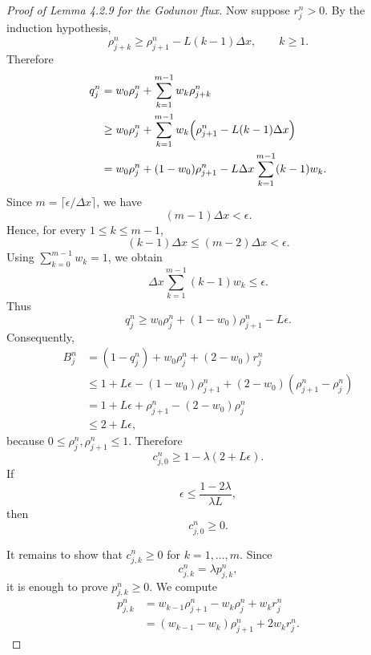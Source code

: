 \begin{proof}[Proof of Lemma 4.2.9 for the Godunov flux]
    Now suppose \(r_j^n>0\). By the induction hypothesis,
    \[
        \rho_{j+k}^n
        \ge
        \rho_{j+1}^n - L(k-1)\Delta x,
        \qquad k\ge1.
    \]
    Therefore
    \[
        \begin{aligned}
            q_j^n
             & =
            w_0\rho_j^n+\sum_{k=1}^{m-1}w_k\rho_{j+k}^n \\
             & \ge
            w_0\rho_j^n
            +
            \sum_{k=1}^{m-1}w_k
            \Bigl(\rho_{j+1}^n-L(k-1)\Delta x\Bigr)     \\
             & =
            w_0\rho_j^n
            +(1-w_0)\rho_{j+1}^n
            -
            L\Delta x\sum_{k=1}^{m-1}(k-1)w_k.
        \end{aligned}
    \]
    Since \(m=\lceil \epsilon/\Delta x\rceil\), we have
    \[
        (m-1)\Delta x<\epsilon.
    \]
    Hence, for every \(1\le k\le m-1\),
    \[
        (k-1)\Delta x\le (m-2)\Delta x <\epsilon.
    \]
    Using \(\sum_{k=0}^{m-1}w_k=1\), we obtain
    \[
        \Delta x\sum_{k=1}^{m-1}(k-1)w_k
        \le \epsilon.
    \]
    Thus
    \[
        q_j^n
        \ge
        w_0\rho_j^n
        +(1-w_0)\rho_{j+1}^n
        -L\epsilon.
    \]
    Consequently,
    \[
        \begin{aligned}
            B_j^n
             & =
            (1-q_j^n)+w_0\rho_j^n+(2-w_0)r_j^n \\
             & \le
            1+L\epsilon
            -(1-w_0)\rho_{j+1}^n
            +(2-w_0)(\rho_{j+1}^n-\rho_j^n)    \\
             & =
            1+L\epsilon
            +\rho_{j+1}^n
            -(2-w_0)\rho_j^n                   \\
             & \le
            2+L\epsilon,
        \end{aligned}
    \]
    because \(0\le \rho_j^n,\rho_{j+1}^n\le1\). Therefore
    \[
        c_{j,0}^n
        \ge
        1-\lambda(2+L\epsilon).
    \]
    If
    \[
        \epsilon\le \frac{1-2\lambda}{\lambda L},
    \]
    then
    \[
        c_{j,0}^n\ge0.
    \]

    It remains to show that \(c_{j,k}^n\ge0\) for \(k=1,\dots,m\). Since
    \[
        c_{j,k}^n=\lambda p_{j,k}^n,
    \]
    it is enough to prove \(p_{j,k}^n\ge0\). We compute
    \[
        \begin{aligned}
            p_{j,k}^n
             & =
            w_{k-1}\rho_{j+1}^n-w_k\rho_j^n+w_k r_j^n \\
             & =
            (w_{k-1}-w_k)\rho_{j+1}^n+2w_k r_j^n.
        \end{aligned}
    \]


\end{proof}
